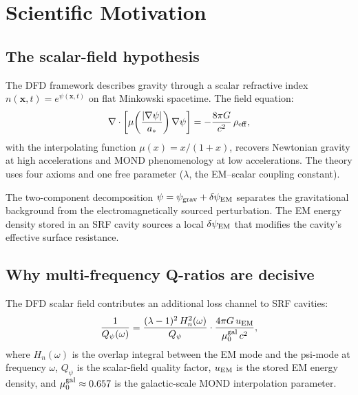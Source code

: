 \documentclass[11pt]{article}
\newcommand{\Qpsi}{Q_\psi}
\newcommand{\Heff}{H_n}
\newcommand{\muG}{\mu_0^{\rm gal}}
\begin{document}
\section{Scientific Motivation}
\label{sec:motivation}

\subsection{The scalar-field hypothesis}

The DFD framework describes gravity through a scalar refractive index
$n(\mathbf{x},t) = e^{\psi(\mathbf{x},t)}$ on flat Minkowski spacetime.
The field equation:
\begin{equation}
\nabla \cdot \left[\mu\!\left(\frac{|\nabla\psi|}{a_*}\right)
\nabla\psi\right] = -\frac{8\pi G}{c^2}\,\rho_{\rm eff},
\label{eq:field_equation}
\end{equation}
with the interpolating function $\mu(x) = x/(1+x)$, recovers Newtonian
gravity at high accelerations and MOND phenomenology at low accelerations.
The theory uses four axioms and one free parameter ($\lambda$, the
EM--scalar coupling constant).

The two-component decomposition $\psi = \psi_{\rm grav} + \delta\psi_{\rm EM}$
separates the gravitational background from the electromagnetically
sourced perturbation. The EM energy density stored in an SRF cavity
sources a local $\delta\psi_{\rm EM}$ that modifies the cavity's
effective surface resistance.

\subsection{Why multi-frequency Q-ratios are decisive}

The DFD scalar field contributes an additional loss channel to SRF
cavities:
\begin{equation}
\frac{1}{Q_\psi(\omega)} = \frac{(\lambda-1)^2\,\Heff^2(\omega)}{\Qpsi}
\cdot\frac{4\pi G\,u_{\rm EM}}{\muG\,c^2},
\label{eq:psi_loss}
\end{equation}
where $\Heff(\omega)$ is the overlap integral between the EM mode and
the psi-mode at frequency $\omega$, $\Qpsi$ is the scalar-field quality
factor, $u_{\rm EM}$ is the stored EM energy density, and $\muG \approx
0.657$ is the galactic-scale MOND interpolation parameter.
\end{document}
